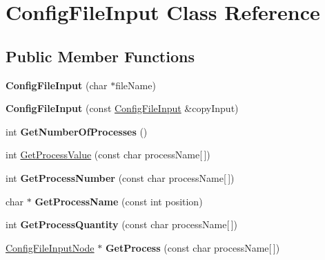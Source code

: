 \hypertarget{class_config_file_input}{}\section{Config\+File\+Input Class Reference}
\label{class_config_file_input}
\subsection*{Public Member Functions}
\begin{DoxyCompactItemize}
\item 
{\bfseries Config\+File\+Input} (char $\ast$file\+Name)\hypertarget{class_config_file_input_a5b6ab2074273bc9617fbc31dfa9ec1a9}{}\label{class_config_file_input_a5b6ab2074273bc9617fbc31dfa9ec1a9}

\item 
{\bfseries Config\+File\+Input} (const \hyperlink{class_config_file_input}{Config\+File\+Input} \&copy\+Input)\hypertarget{class_config_file_input_acb6a962a5a02bacadafcb454b866afb6}{}\label{class_config_file_input_acb6a962a5a02bacadafcb454b866afb6}

\item 
int {\bfseries Get\+Number\+Of\+Processes} ()\hypertarget{class_config_file_input_a58a7e540964501de1cc7c5b1dd46e1e3}{}\label{class_config_file_input_a58a7e540964501de1cc7c5b1dd46e1e3}

\item 
int \hyperlink{class_config_file_input_acc67c518509dd65e79b0b3781ad14f91}{Get\+Process\+Value} (const char process\+Name\mbox{[}$\,$\mbox{]})
\item 
int {\bfseries Get\+Process\+Number} (const char process\+Name\mbox{[}$\,$\mbox{]})\hypertarget{class_config_file_input_aef9819521dce634a8e7d968742f95b93}{}\label{class_config_file_input_aef9819521dce634a8e7d968742f95b93}

\item 
char $\ast$ {\bfseries Get\+Process\+Name} (const int position)\hypertarget{class_config_file_input_aedf743487e75ba4a319c10ef6a3a4d6c}{}\label{class_config_file_input_aedf743487e75ba4a319c10ef6a3a4d6c}

\item 
int {\bfseries Get\+Process\+Quantity} (const char process\+Name\mbox{[}$\,$\mbox{]})\hypertarget{class_config_file_input_a618a0c90153a822e1fcdc866c922db67}{}\label{class_config_file_input_a618a0c90153a822e1fcdc866c922db67}

\item 
\hyperlink{struct_config_file_input_node}{Config\+File\+Input\+Node} $\ast$ {\bfseries Get\+Process} (const char process\+Name\mbox{[}$\,$\mbox{]})\hypertarget{class_config_file_input_afafd07e6ae0d86894c6e20d1d417763b}{}\label{class_config_file_input_afafd07e6ae0d86894c6e20d1d417763b}


\end{DoxyCompactItemize}
